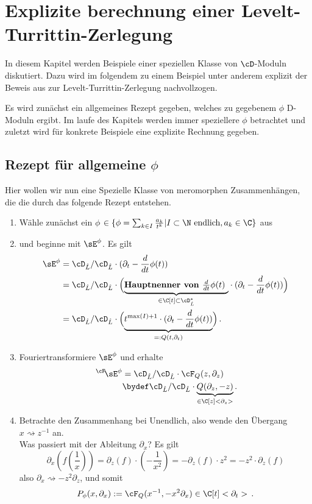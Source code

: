 \chapter{Explizite berechnung einer Levelt-Turrittin-Zerlegung}
In diesem Kapitel werden Beispiele einer speziellen Klasse von $\cD$-Moduln
diskutiert. Dazu wird im folgendem zu einem Beispiel unter anderem explizit der
Beweis aus \cite{sabbah_cimpa90} zur Levelt-Turrittin-Zerlegung nachvollzogen.

Es wird zunächst ein allgemeines Rezept gegeben, welches zu gegebenem $\phi$
D-Moduln ergibt. Im laufe des Kapitels werden immer speziellere $\phi$
betrachtet und zuletzt wird für konkrete Beispiele eine explizite Rechnung
gegeben.

\section{Rezept für allgemeine $\phi$} \label{sec:allgemeinProblem}
Hier wollen wir nun eine Spezielle Klasse von meromorphen Zusammenhängen, die
die durch das folgende Rezept entstehen.
\begin{enumerate}
\item Wähle zunächst ein $\phi$
$\in\{\phi=\sum_{k\in I}\frac{a_k}{t^{k}}|I\subset\N\mbox{ endlich}
,a_k\in \C\}$
aus
\item und beginne mit $\sE^{\phi}$. Es gilt
\begin{align*}
\sE^{\phi} &= \cD_{\hat L}/\cD_{\hat L}\cdot (\partial_t-\frac{d}{dt}\phi(t))
\\&=\cD_{\hat L}/\cD_{\hat L}\cdot \Big(\underset{\in\C[t]\subset\cD_{\hat L}^*}
    {\underbrace{\mbox{\textbf{Hauptnenner von $\frac{d}{dt}\phi(t)$ }}}}
  \cdot (\partial_t-\frac{d}{dt}\phi(t))\Big)
\\&=\cD_{\hat L}/\cD_{\hat L}\cdot \Big(
  \underset{=:Q(t,\partial_t)}{\underbrace{
  t^{\max(I)+1} \cdot (\partial_t-\frac{d}{dt}\phi(t))}}\Big) \,.
\end{align*}
\begin{comment}
Dies ändert den meromorphen Zusammenhang nicht, weil $t^{\max(I)+1}$ eine
Einheit in $\cD_{\hat L}$ (und auch in $\cD_{L}$) ist.
\end{comment}
\item Fouriertransformiere $\sE^{\phi}$ und erhalte
\begin{align*}
\,^\cF\!\sE^{\phi}&=\cD_{\hat L}/\cD_{\hat L}\cdot{\cF_Q(z,\partial_z)}
\\&\bydef \cD_{\hat L}/\cD_{\hat L}\cdot
  \underset{\in\C[z]<\partial_z>}{\underbrace{Q(\partial_z,-z)}} \,.
\end{align*}
\item Betrachte den Zusammenhang bei Unendlich, also wende den Übergang
$x\rightsquigarrow z^{-1}$ an.\\
Was passiert mit der Ableitung $\partial_x$?
Es gilt
\[
\partial_x (f(\frac{1}{x}))=
\partial_z(f)\cdot (-\frac{1}{x^2})=
-\partial_z(f)\cdot z^2= %
- z^2 \cdot \partial_z(f)
\]
also $ \partial_x\rightsquigarrow-z^2\partial_z $, und somit
\[
P_\phi(x,\partial_x):=\cF_Q(x^{-1},-x^2\partial_x) \in \C[t]<\partial_t> \,.
\]
\end{enumerate}
